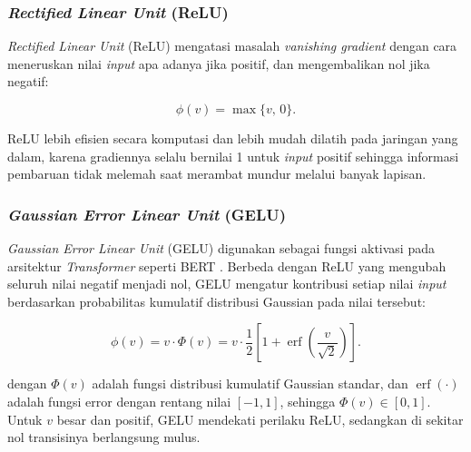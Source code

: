 \subsubsection{\textit{Rectified Linear Unit} (ReLU)}

\textit{Rectified Linear Unit} (ReLU) mengatasi masalah \textit{vanishing
gradient} dengan cara meneruskan nilai \textit{input} apa adanya jika
positif, dan mengembalikan nol jika negatif:

\vspace{-1em}
\setlength{\abovedisplayskip}{0pt}
\begin{equation}
    \phi(v) = \max\{v,\, 0\}.
    \label{eq:relu}
\end{equation}

ReLU lebih efisien secara komputasi dan lebih mudah dilatih pada jaringan
yang dalam, karena gradiennya selalu bernilai 1 untuk \textit{input}
positif sehingga informasi pembaruan tidak melemah saat merambat mundur
melalui banyak lapisan.

\subsubsection{\textit{Gaussian Error Linear Unit} (GELU)}

\textit{Gaussian Error Linear Unit} (GELU) digunakan sebagai 
fungsi aktivasi pada arsitektur \textit{Transformer} seperti BERT \parencite{hendrycks2016}. Berbeda dengan ReLU 
yang mengubah seluruh nilai negatif menjadi nol, GELU mengatur kontribusi 
setiap nilai \textit{input} berdasarkan probabilitas kumulatif distribusi 
Gaussian pada nilai tersebut:

\vspace{-1em}
\setlength{\abovedisplayskip}{0pt}
\begin{equation}
    \phi(v) = v \cdot \Phi(v) = v \cdot \frac{1}{2}\left[1 +
    \operatorname{erf}\!\left(\frac{v}{\sqrt{2}}\right)\right].
    \label{eq:gelu}
\end{equation}

\noindent dengan $\Phi(v)$ adalah fungsi distribusi kumulatif Gaussian standar,
dan $\operatorname{erf}(\cdot)$ adalah fungsi error dengan rentang nilai
$[-1, 1]$, sehingga $\Phi(v) \in [0, 1]$. Untuk $v$ besar dan positif,
GELU mendekati perilaku ReLU, sedangkan di sekitar nol transisinya
berlangsung mulus.

